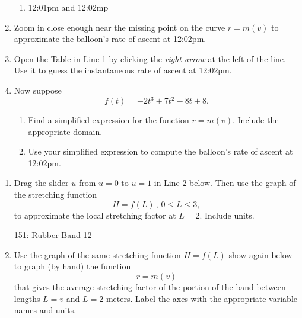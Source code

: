 \documentclass{ximera}
\begin{document}
\begin{question}
\begin{enumerate}
\begin{enumerate}
\item 12:01pm and 12:02mp
\end{enumerate}

\item Zoom in close enough near the missing point on the curve $r=m(v)$ to approximate the balloon's rate of ascent at 12:02pm.

\item Open the Table in Line 1 by clicking the \emph{right arrow} at the left of the line. Use it to guess the instantaneous rate of ascent at 12:02pm.

\item Now suppose
\[
   f(t) = -2t^3+7t^2-8t+8 .
\]

\begin{enumerate}
\item Find a simplified expression for the function $r=m(v)$. Include the appropriate domain.

\item Use your simplified expression to compute the balloon's rate of ascent at 12:02pm.
\end{enumerate}

\end{enumerate}
\end{question}

\begin{question}  \label{Qdfsa4555}

\begin{enumerate}

\item Drag the slider $u$ from $u=0$ to $u=1$ in Line 2 below. Then use the graph of the stretching function
\[
   H = f(L) \, , \, 0\leq L \leq 3 ,
\]
to approximate the local stretching factor at $L=2$. Include units. 

\begin{onlineOnly}
    \begin{center}
\end{center}
\end{onlineOnly}

\href{https://www.desmos.com/calculator/boubpczsne}{151: Rubber Band 12}

\item Use the graph of the same stretching function $H=f(L)$ show again below to graph (by hand) the function
\[
    r = m(v)
\]
that gives the average stretching factor of the portion of the band between lengths $L=v$ and $L=2$ meters. Label the axes with the appropriate variable names and units.




\end{enumerate}


\end{question}
\end{document}
